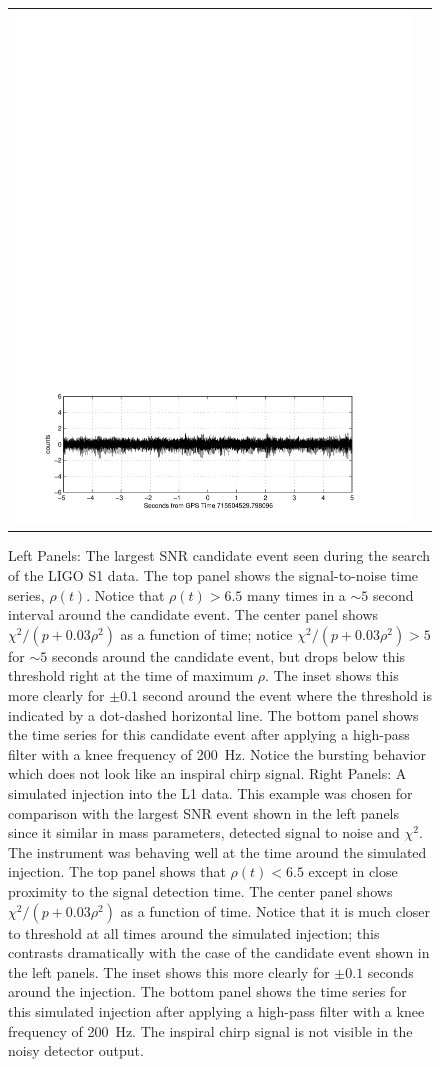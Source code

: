 \begin{figure}[p]
\begin{center}
\begin{tabular}{cc}
\includegraphics[width=0.475\linewidth]{figures/pipeline/injection-ts}
\end{tabular}
\end{center}
\caption{\label{f:s1loudest}%
Left Panels: The largest SNR candidate event seen during the search of the
LIGO S1 data. The top panel shows the signal-to-noise time series,
$\rho(t)$.  Notice that $\rho(t) > 6.5$ many times in a  $\sim 5$ second
interval around the candidate event.   The center panel shows $\chi^2/ (p+
0.03 \rho^2)$ as a function of time;  notice $\chi^2 / (p+ 0.03 \rho^2) > 5$
for $\sim 5$ seconds around the candidate event,  but drops below this
threshold right at the time of maximum $\rho$.  The inset shows this more
clearly for $\pm 0.1$ second around the event where the threshold is indicated
by a dot-dashed horizontal line.  The bottom panel shows the time series for
this candidate event after applying a high-pass filter with a knee frequency
of 200~Hz.  Notice the bursting behavior which does not look like an inspiral
chirp signal.  \break
Right Panels: A simulated injection into the L1 data.  This example was chosen
for comparison with the largest SNR event shown in the left panels since it
similar in mass parameters, detected signal to noise and $\chi^2$.   The
instrument was behaving well at the time around the simulated injection.  The
top panel shows that $\rho(t) < 6.5$ except in close proximity to the signal
detection time.   The center panel shows $\chi^2/ (p+ 0.03 \rho^2)$ as a
function of time.  Notice that it is much closer to threshold at all times
around the simulated injection; this contrasts dramatically with the case of
the candidate event shown in the left panels.   The inset shows this more
clearly for $\pm 0.1$ seconds around the injection.  The bottom panel shows
the time series for this simulated injection after applying a high-pass filter
with a knee frequency of 200~Hz.  The inspiral chirp signal is not visible in
the noisy detector output.}
\end{figure}

